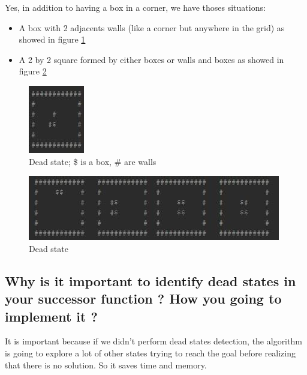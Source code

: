 \documentclass{article}
\begin{document}
Yes, in addition to having a box in a corner, we have thoses situations:
\begin{itemize}
    \item A box with 2 adjacents walls (like a corner but anywhere in the grid) as showed in figure \ref{fig:dead1}
    \item A 2 by 2 square formed by either boxes or walls and boxes as showed in figure \ref{fig:dead2}
\end{itemize}

\begin{figure}[h] %
 \centering
 \includegraphics[scale=1.5]{dead1.JPG} 
 \caption{Dead state; \$ is a box, \# are walls}
 \label{fig:dead1}
\end{figure}

\begin{figure}[h] %
 \centering
 \includegraphics[width=\textwidth]{dead2.JPG} 
 \caption{Dead state}
 \label{fig:dead2}
\end{figure}

\subsection*{Why is it important to identify dead states in your successor function ? How you going to implement it ?}
It is important because if we didn't perform dead states detection, the algorithm is going to explore a lot of other states trying to reach the goal before realizing that there is no solution. So it saves time and memory.
\end{document}
